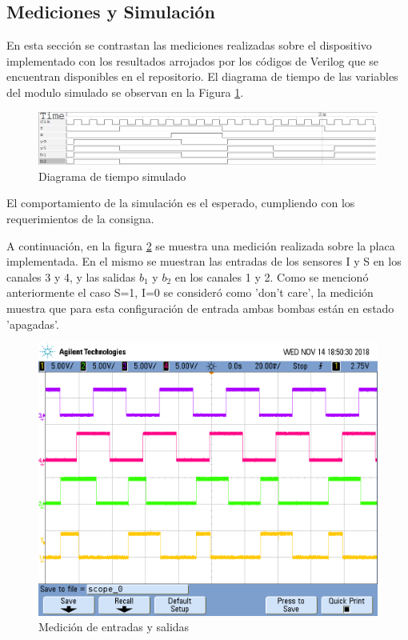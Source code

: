 \subsection*{Mediciones y Simulación}

En esta sección se contrastan las mediciones realizadas sobre el dispositivo implementado con los resultados arrojados por los códigos de Verilog que se encuentran disponibles en el repositorio. El diagrama de tiempo de las variables del modulo simulado se observan en la Figura \ref{1_fig_verilog_moore}.


\begin{figure}[H]
\centering
\includegraphics[scale=0.45]{images/time_diagram_moore}
\caption{Diagrama de tiempo simulado}
\label{1_fig_verilog_moore}
\end{figure}

El comportamiento de la simulación es el esperado, cumpliendo con los requerimientos de la consigna.

A continuación, en la figura \ref{1_fig_medicion_moore} se muestra una medición realizada sobre la placa implementada. En el mismo se muestran las entradas de los sensores I y S en los canales 3 y 4, y las salidas $b_1$ y $b_2$ en los canales 1 y 2. Como se mencionó anteriormente el caso S=1, I=0 se consideró como 'don't care', la medición muestra que para esta configuración de entrada ambas bombas están en estado 'apagadas'.

\begin{figure}[H]
\centering
\includegraphics[scale=0.3]{images/medicion_ej1_moore}
\caption{Medición de entradas y salidas}
\label{1_fig_medicion_moore}
\end{figure}


